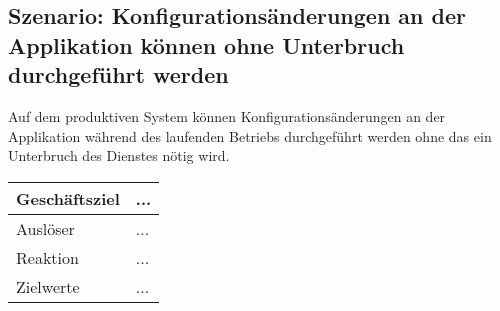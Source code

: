 \subsection{Szenario: Konfigurationsänderungen an der Applikation können ohne Unterbruch durchgeführt werden}

Auf dem produktiven System können Konfigurationsänderungen an der Applikation während des laufenden Betriebs durchgeführt werden ohne das ein Unterbruch des Dienstes nötig wird.

\begin{table}[H]
	\centering
	\begin{tabular}{ | p{3cm} | p{11cm} | }
		\toprule
		Geschäftsziel & ... \\ \hline
		Auslöser & ... \\ \hline
		Reaktion & ... \\ \hline
		Zielwerte & ... \\
		\bottomrule
	\end{tabular}
\end{table}